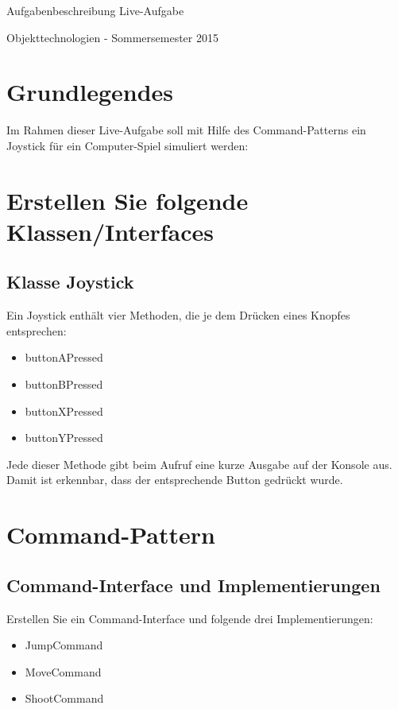 \documentclass[oneside,a4paper]{scrartcl}
\author{Johannes Schneider}
\begin{document}
\centerline{\sc \large Aufgabenbeschreibung Live-Aufgabe}
\vspace{.5pc}
\centerline{\sc Objekttechnologien - Sommersemester 2015}
\vspace{2pc}



\section{Grundlegendes}

Im Rahmen dieser Live-Aufgabe soll mit Hilfe des Command-Patterns ein Joystick für ein Computer-Spiel simuliert werden:


\section{Erstellen Sie folgende Klassen/Interfaces}
\subsection{Klasse Joystick}

Ein Joystick enthält vier Methoden, die je dem Drücken eines Knopfes entsprechen:


\begin{itemize}
\item buttonAPressed
\item buttonBPressed
\item buttonXPressed
\item buttonYPressed
\end{itemize}

Jede dieser Methode gibt beim Aufruf eine kurze Ausgabe auf der Konsole aus. Damit ist erkennbar, dass der entsprechende Button gedrückt wurde.


\section{Command-Pattern}

\subsection{Command-Interface und Implementierungen}

Erstellen Sie ein Command-Interface und folgende drei Implementierungen:

\begin{itemize}
\item JumpCommand
\item MoveCommand
\item ShootCommand
\end{itemize}
\end{document}
